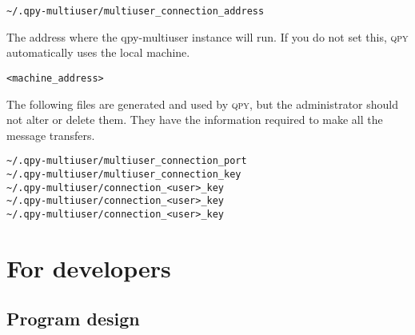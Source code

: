 \documentclass[a4paper,12pt]{article}
\newcommand{\qpy}{\textsc{qpy}}
\begin{document}
\begin{verbatim}
~/.qpy-multiuser/multiuser_connection_address
\end{verbatim}

The address where the qpy-multiuser instance will run.
If you do not set this, \qpy{} automatically uses the local machine.

\begin{lstlisting}[style=FileStyle]
<machine_address>
\end{lstlisting}


The following files are generated and used by \qpy{}, but the administrator should not alter or delete them.
They have the information required to make all the message transfers.

\begin{verbatim}
~/.qpy-multiuser/multiuser_connection_port
~/.qpy-multiuser/multiuser_connection_key
~/.qpy-multiuser/connection_<user>_key
~/.qpy-multiuser/connection_<user>_key
~/.qpy-multiuser/connection_<user>_key
\end{verbatim}









\newpage
\section{For developers}



\subsection{Program design}

\linespread{0.8}
\end{document}
